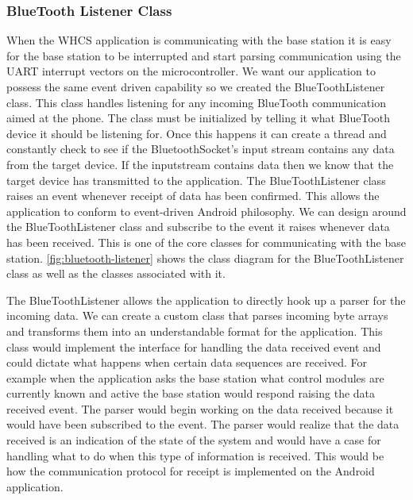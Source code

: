 \subsubsection{BlueTooth Listener Class} When the WHCS application is
communicating with the base station it is easy for the base station to be
interrupted and start parsing communication using the UART interrupt vectors on
the microcontroller. We want our application to possess the same event driven
capability so we created the BlueToothListener class. This class handles
listening for any incoming BlueTooth communication aimed at the phone. The
class must be initialized by telling it what BlueTooth device it should be
listening for. Once this happens it can create a thread and constantly check to
see if the BluetoothSocket{}'s input stream contains any data from the target
device. If the inputstream contains data then we know that the target device
has transmitted to the application. The BlueToothListener class raises an event
whenever receipt of data has been confirmed. This allows the application to
conform to event{}-driven Android philosophy. We can design around the
BlueToothListener class and subscribe to the event it raises whenever data has
been received. This is one of the core classes for communicating with the base
station. \autoref{fig:bluetooth-listener} shows the class diagram for the
BlueToothListener class as well as the classes associated with it.


The BlueToothListener allows the application to directly hook up a parser for
the incoming data. We can create a custom class that parses incoming byte
arrays and transforms them into an understandable format for the application.
This class would implement the interface for handling the data received event
and could dictate what happens when certain data sequences are received. For
example when the application asks the base station what control modules are
currently known and active the base station would respond raising the data
received event. The parser would begin working on the data received because it
would have been subscribed to the event. The parser would realize that the data
received is an indication of the state of the system and would have a case for
handling what to do when this type of information is received. This would be
how the communication protocol for receipt is implemented on the Android
application.

